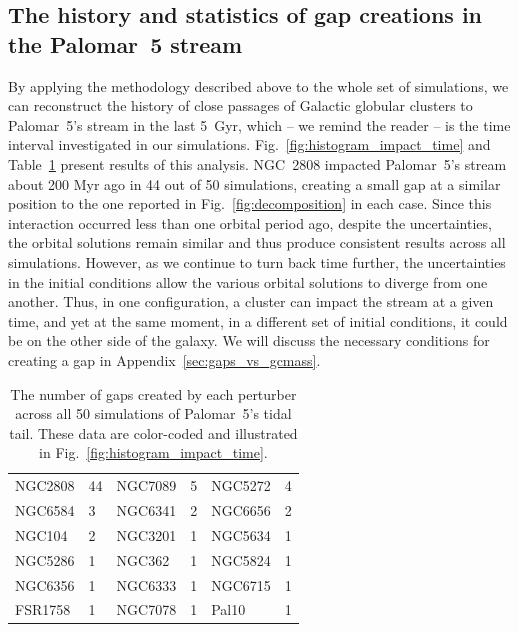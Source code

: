 \documentclass{aa}
\begin{document}
  \subsection{The history and statistics of gap creations in the Palomar~5 stream}\label{sect:history}
  
    By applying the methodology described above to the whole set of simulations, we can reconstruct the history of close passages of Galactic globular clusters to Palomar~5's stream in the last 5~Gyr, which -- we remind the reader -- is the time interval investigated in our simulations.  Fig.~\ref{fig:histogram_impact_time} and Table~\ref{tab:gaps_per_perturber} present results of this analysis. NGC~2808 impacted Palomar~5's stream about 200 Myr ago in 44 out of 50 simulations, creating a small gap at a similar position to the one reported in Fig.~\ref{fig:decomposition} in each case. Since this interaction occurred less than one orbital period ago, despite the uncertainties, the orbital solutions remain similar and thus produce consistent results across all simulations. However, as we continue to turn back time further, the uncertainties in the initial conditions allow the various orbital solutions to diverge from one another. Thus, in one configuration, a cluster can impact the stream at a given time, and yet at the same moment, in a different set of initial conditions, it could be on the other side of the galaxy. We will discuss the necessary conditions for creating a gap in Appendix~\ref{sec:gaps_vs_gcmass}. 


    
    

    \begin{table}[h]
      \centering
      \caption{The number of gaps created by each perturber across all 50 simulations of Palomar~5's tidal tail. These data are color-coded and illustrated in Fig.~\ref{fig:histogram_impact_time}.}
      \label{tab:gaps_per_perturber}
      \begin{tabular}{|ll|ll|ll|}
      \hline
      NGC2808 & 44 & NGC7089 & 5 & NGC5272 & 4 \\
      NGC6584 & 3 & NGC6341 & 2 & NGC6656 & 2 \\
      NGC104 & 2 & NGC3201 & 1 & NGC5634 & 1 \\
      NGC5286 & 1 & NGC362 & 1 & NGC5824 & 1 \\
      NGC6356 & 1 & NGC6333 & 1 & NGC6715 & 1 \\
      FSR1758 & 1 & NGC7078 & 1 & Pal10 & 1 \\
      \hline
      \end{tabular}
    \end{table} 
    
\end{document}
